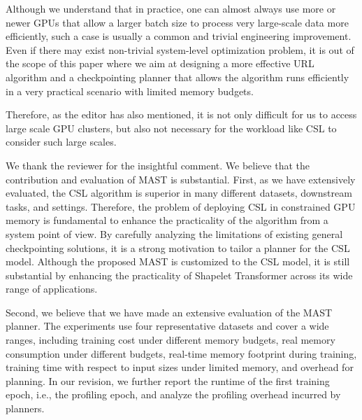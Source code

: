 \begin{sloppypar}
Although we understand that in practice, one can almost always use more or newer GPUs that allow a larger batch size to process very large-scale data more efficiently, such a case is usually a common and trivial engineering improvement. Even if there may exist non-trivial system-level optimization problem, it is out of the scope of this paper where we aim at designing a more effective URL algorithm and a checkpointing planner that allows the algorithm runs efficiently in a very practical scenario with limited memory budgets. 

Therefore, as the editor has also mentioned, it is not only difficult for us to access large scale GPU clusters, but also not necessary for the workload like CSL to consider such large scales.



We thank the reviewer for the insightful comment. We believe that the contribution and evaluation of MAST is substantial. First, as we have extensively evaluated, the CSL algorithm is superior in many different datasets, downstream tasks, and settings. Therefore, the problem of deploying CSL in constrained GPU memory is fundamental to enhance the practicality of the algorithm from a system point of view. By carefully analyzing the limitations of existing general checkpointing solutions, it is a strong motivation to tailor a planner for the CSL model. Although the proposed MAST is customized to the CSL model, it is still substantial by enhancing the practicality of Shapelet Transformer across its wide range of applications.

Second, we believe that we have made an extensive evaluation of the MAST planner. The experiments use four representative datasets and cover a wide ranges, including training cost under different memory budgets, real memory consumption under different budgets, real-time memory footprint during training, training time with respect to input sizes under limited memory, and overhead for planning. In our revision, we further report the runtime of the first training epoch, i.e., the profiling epoch, and analyze the profiling overhead incurred by planners.


\end{sloppypar}
